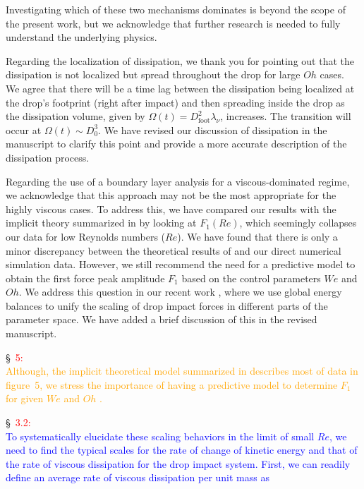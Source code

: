\documentclass[]{article}
\newcommand*\blue{\textcolor{blue}}
\newcommand*\red{\textcolor{red}}
\newcommand{\VS}[1]{{\textcolor{orange}{#1}}}
\begin{document}
\begin{enumerate}
\begin{enumerate}
		Investigating which of these two mechanisms dominates is beyond the scope of the present work, but we acknowledge that further research is needed to fully understand the underlying physics.
		
		Regarding the localization of dissipation, we thank you for pointing out that the dissipation is not localized but spread throughout the drop for large $Oh$ cases. We agree that there will be a time lag between the dissipation being localized at the drop's footprint (right after impact) and then spreading inside the drop as the dissipation volume, given by $\Omega(t) = D_{\text{foot}}^2\lambda_\nu$, increases. The transition will occur at $\Omega(t) \sim D_0^3$. We have revised our discussion of dissipation in the manuscript to clarify this point and provide a more accurate description of the dissipation process.
		
		Regarding the use of a boundary layer analysis for a viscous-dominated regime, we acknowledge that this approach may not be the most appropriate for the highly viscous cases. To address this, we have compared our results with the implicit theory summarized in \citet{cheng2021drop} by looking at $F_1(Re)$, which seemingly collapses our data for low Reynolds numbers ($Re$). We have found that there is only a minor discrepancy between the theoretical results of \citet{Gordillo2018, cheng2021drop} and our direct numerical simulation data. However, we still recommend the need for a predictive model to obtain the first force peak amplitude $F_1$ based on the control parameters $We$ and $Oh$. We address this question in our recent work \citep{sanjay2024PRL}, where we use global energy balances to unify the scaling of drop impact forces in different parts of the parameter space. We have added a brief discussion of this in the revised manuscript.
		
		\S~\red{5:}\\
		\VS{Although, the implicit theoretical model summarized in \citet{cheng2021drop} describes most of data in figure~5, we stress the importance of having a predictive model to determine $F_1$ for given $We$ and $Oh$ \citep{sanjay2024PRL}.} 
		
			\S~\red{3.2:}\\
		\blue{To systematically elucidate these scaling behaviors in the limit of small $Re$, we need to find the typical scales for the rate of change of kinetic energy and that of the rate of viscous dissipation for the drop impact system. First, we can readily define an average rate of viscous dissipation per unit mass as}
		

\end{enumerate}
\end{enumerate}
\end{document}
